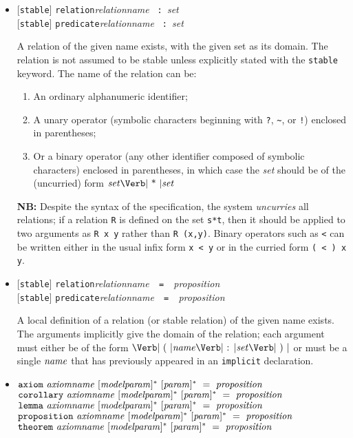 \documentclass{article}
\newcommand{\keywd}[1]{\mbox{\texttt{#1}}\xspace}
\newcommand{\AXIOM}{\keywd{axiom}}
\newcommand{\CONST}{\keywd{const}}
\newcommand{\COROLLARY}{\keywd{corollary}}
\newcommand{\IMPLICIT}{\keywd{implicit}}
\newcommand{\LEMMA}{\keywd{lemma}}
\newcommand{\PROPOSITION}{\keywd{proposition}}
\newcommand{\PREDICATE}{\keywd{predicate}}
\newcommand{\RELATION}{\keywd{relation}}
\newcommand{\STABLE}{\keywd{stable}}
\newcommand{\THEOREM}{\keywd{theorem}}
\newcommand{\metav}[1]{\mbox{\textit{#1}}\xspace}
\newcommand{\Ident}{\metav{name}}
\newcommand{\Identifier}{\Ident}
\newcommand{\Setexp}{\metav{set}}
\newcommand{\Proposition}{\metav{proposition}}
\newcommand{\Param}{\metav{param}}
\newcommand{\MParam}{\metav{modelparam}}
\newcommand{\Term}{\metav{term}}
\newcommand{\COLON}{\mbox{\Verb| : |}}
\newcommand{\EQUALS}{\mbox{\Verb| = |}}
\newcommand{\LPAREN}{\mbox{\Verb| ( |}}
\newcommand{\RPAREN}{\mbox{\Verb| ) |}}
\newcommand{\TIMES}{\mbox{\Verb| * |}}
\newcommand{\NB}{\textbf{NB: }}
\begin{document}
\begin{itemize}
      A local abbreviation of a term.  The set containing the constant
      may be inferred from the \Term.  The possible names are the same
      as in the previous case for \CONST.

\item{} [\STABLE{}] \RELATION \metav{relationname} \COLON \Setexp\\
     {} [\STABLE{}] \PREDICATE \metav{relationname} \COLON \Setexp
  
  A relation of the given name exists, with the given set as its
  domain.  The relation is not assumed to be stable unless explicitly
  stated with the \STABLE keyword.
The name of the relation can be:
\begin{enumerate}
\item  An ordinary alphanumeric identifier;
\item  A unary operator (symbolic characters beginning with \Verb|?|, \Verb|~|, or \Verb|!|) enclosed in parentheses;
\item  Or a binary operator (any other identifier composed of symbolic characters) enclosed in parentheses, in which case the \Setexp should be of the (uncurried) form $\Setexp \TIMES \Setexp$
\end{enumerate}

\NB Despite the syntax of the specification, the system
\emph{uncurries} all relations; if a relation \Verb|R| is defined on
the set \Verb|s*t|, then it should be applied to two arguments as
\Verb|R x y| rather than \Verb|R (x,y)|.  Binary operators such as
\Verb|<| can be written either in the usual infix form \Verb|x < y| or
in the curried form \Verb|( < ) x y|.

\item{} [\STABLE{}] \RELATION \metav{relationname}\ \EQUALS\ \Proposition\\
     {} [\STABLE{}] \PREDICATE \metav{relationname}\ \EQUALS\ \Proposition
  
     A local definition of a relation (or stable relation) of the
     given name exists.  The arguments implicitly give the domain of
     the relation; each argument must either be of the form $\LPAREN
     \Identifier \COLON \Setexp \RPAREN$ or must be a single
     $\Identifier$ that has previously appeared in an \IMPLICIT
     declaration.


\item $\AXIOM\ \metav{axiomname}\ [\MParam]^*\ [\Param]^*\ =\ \Proposition$\\
      $\COROLLARY\ \metav{axiomname}\ [\MParam]^*\ [\Param]^*\ =\ \Proposition$\\
      $\LEMMA\ \metav{axiomname}\ [\MParam]^*\ [\Param]^*\ =\ \Proposition$\\
      $\PROPOSITION\ \metav{axiomname}\ [\MParam]^*\ [\Param]^*\ =\ \Proposition$\\
      $\THEOREM\ \metav{axiomname}\ [\MParam]^*\ [\Param]^*\ =\ \Proposition$
      

\end{itemize}
\end{document}
